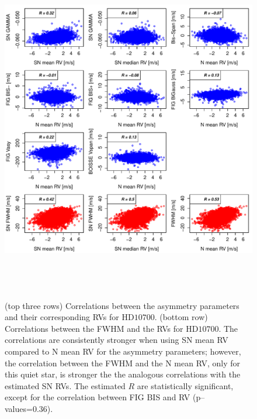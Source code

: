 \documentclass{aa}
\begin{document}
\begin{figure}[htbp]
\begin{center}
\includegraphics[height = 6in]{HD10700_[4]Comparison_para.pdf}  
   \caption{(top three rows) Correlations between the asymmetry parameters and their corresponding RVs for $\text{HD}10700$. 
(bottom row) Correlations between the FWHM and the RVs for $\text{HD}10700$. 
The correlations are consistently stronger when using SN mean RV compared to N mean RV for the asymmetry parameters; however, the correlation between the FWHM and the N mean RV, only for this quiet star, is stronger the the analogous correlations with the estimated SN RVs. The estimated $R$ are statistically significant, except for the correlation between FIG BIS and RV (p--values=0.36).}   
   \label{fig:Tau:corrPlot}
\end{center}
\end{figure}
\end{document}
